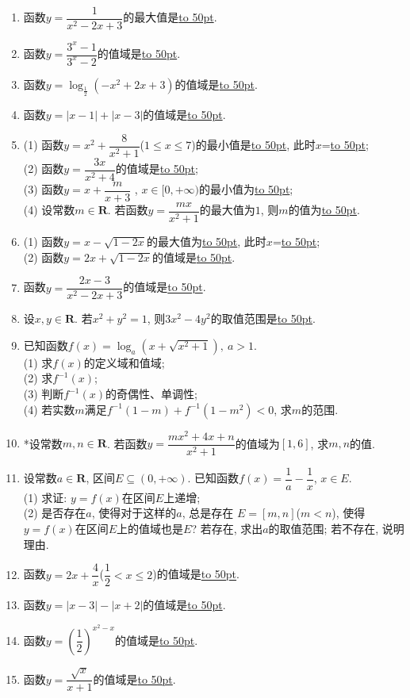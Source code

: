 \documentclass[10pt,a4paper]{article}
\newcommand{\blank}[1]{\underline{\hbox to #1pt{}}}
\begin{document}
\begin{enumerate}[1.]
\item 函数$y=\dfrac 1{x^2-2x+3}$的最大值是\blank{50}.
\item 函数$y=\dfrac{3^x-1}{3^x-2}$的值域是\blank{50}.
\item 函数$y=\log_{\frac 12}(-x^2+2x+3)$的值域是\blank{50}.
\item 函数$y=|x-1|+|x-3|$的值域是\blank{50}.
\item (1) 函数$y=x^2+\dfrac 8{x^2+1}$($1\le x\le 7$)的最小值是\blank{50}, 此时$x$=\blank{50};\\
(2) 函数$y=\dfrac{3x}{x^2+4}$的值域是\blank{50};\\
(3) 函数$y=x+\dfrac m{x+3}$ , $x\in [0,+\infty)$的最小值为\blank{50};\\
(4) 设常数$m\in \mathbf{R}$. 若函数$y=\dfrac{mx}{x^2+1}$的最大值为$1$, 则$m$的值为\blank{50}.
\item (1) 函数$y=x-\sqrt{1-2x}$的最大值为\blank{50}, 此时$x$=\blank{50};\\
(2) 函数$y=2x+\sqrt{1-2x}$的值域是\blank{50}.
\item 函数$y=\dfrac{2x-3}{x^2-2x+3}$的值域是\blank{50}.
\item 设$x,y\in \mathbf{R}$. 若$x^2+y^2=1$, 则$3x^2-4y^2$的取值范围是\blank{50}.
\item 已知函数$f(x)=\log_a(x+\sqrt{x^2+1}), \ a>1$.\\
(1) 求$f(x)$的定义域和值域;\\
(2) 求$f^{-1}(x)$;\\
(3) 判断$f^{-1}(x)$的奇偶性、单调性;\\
(4) 若实数$m$满足$f^{-1}(1-m)+f^{-1}(1-m^2)<0$, 求$m$的范围.
\item *设常数$m,n\in \mathbf{R}$. 若函数$y=\dfrac{mx^2+4x+n}{x^2+1}$的值域为$[1,6]$, 求$m,n$的值.
\item 设常数$a\in \mathbf{R}$, 区间$E\subseteq (0,+\infty)$. 已知函数$f(x)=\dfrac 1a-\dfrac 1x$, $x\in E$.\\
(1) 求证: $y=f(x)$在区间$E$上递增;\\
(2) 是否存在$a$, 使得对于这样的$a$, 总是存在 $E=[m,n]$($m<n$), 使得$y=f(x)$在区间$E$上的值域也是$E$? 若存在, 求出$a$的取值范围; 若不存在, 说明理由.
\item 函数$y=2x+\dfrac 4x$($\dfrac 12<x\le 2$)的值域是\blank{50}.
\item 函数$y=|x-3|-|x+2|$的值域是\blank{50}.
\item 函数$y=(\dfrac 12)^{x^2-x}$的值域是\blank{50}.
\item 函数$y=\dfrac{\sqrt x}{x+1}$的值域是\blank{50}.

\end{enumerate}
\end{document}

